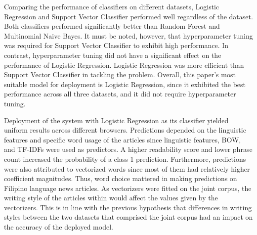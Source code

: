 Comparing the performance of classifiers on different datasets, Logistic Regression and Support Vector Classifier performed well regardless of the dataset. Both classifiers performed significantly better than Random Forest and Multinomial Naive Bayes. It must be noted, however, that hyperparameter tuning was required for Support Vector Classifier to exhibit high performance. In contrast, hyperparameter tuning did not have a significant effect on the performance of Logistic Regression. Logistic Regression was more efficient than Support Vector Classifier in tackling the problem. Overall, this paper's most suitable model for deployment is Logistic Regression, since it exhibited the best performance across all three datasets, and it did not require hyperparameter tuning.

Deployment of the system with Logistic Regression as its classifier yielded uniform results across different browsers. Predictions depended on the linguistic features and specific word usage of the articles since linguistic features, BOW, and TF-IDFs were used as predictors. A higher readability score and lower phrase count increased the probability of a class 1 prediction. Furthermore, predictions were also attributed to vectorized words since most of them had relatively higher coefficient magnitudes. Thus, word choice mattered in making predictions on Filipino language news articles. As vectorizers were fitted on the joint corpus, the writing style of the articles within would affect the values given by the vectorizers. This is in line with the previous hypothesis that differences in writing styles between the two datasets that comprised the joint corpus had an impact on the accuracy of the deployed model.

\pagebreak
